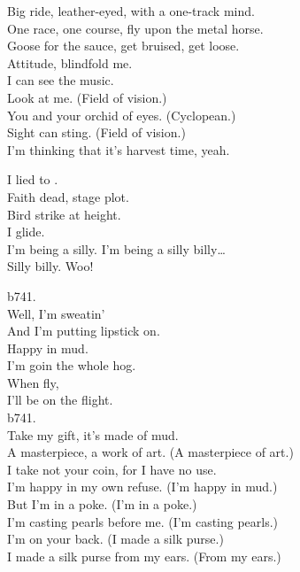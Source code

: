 
Big ride, leather-eyed, with a one-track mind. \\
One race, one course, fly upon the metal horse. \\
Goose for the sauce, get bruised, get loose. \\
Attitude, blindfold me. \\
I can see the music. \\

Look at me. (Field of vision.) \\
You and your orchid of eyes. (Cyclopean.) \\
Sight can sting. (Field of vision.) \\
I'm thinking that it's harvest time, yeah. \\


I lied to . \\
Faith dead, stage plot. \\
Bird strike at height. \\
I glide. \\

I'm being a silly. I'm being a silly billy… \\
Silly billy. Woo! \\




b741. \\

Well, I'm sweatin' \\
And I'm putting lipstick on. \\
Happy in mud. \\
I'm goin the whole hog. \\

When  fly, \\
I'll be on the flight. \\
b741. \\

Take my gift, it's made of mud. \\
A masterpiece, a work of art. (A masterpiece of art.) \\
I take not your coin, for I have no use. \\
I'm happy in my own refuse. (I'm happy in mud.) \\
But I'm in a poke. (I'm in a poke.) \\
I'm casting pearls before me. (I'm casting pearls.) \\
I'm on your back. (I made a silk purse.) \\
I made a silk purse from my ears. (From my ears.) \\

